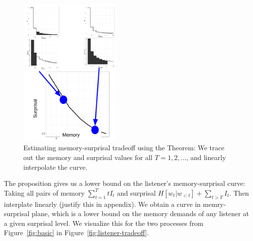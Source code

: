 \begin{figure}
	\begin{center}
\includegraphics[width=0.45\textwidth]{figures/interpolate-curve.png}
\end{center}
	\caption{Estimating memory-surprisal tradeoff using the Theorem: We trace out the memory and surprisal values for all $T=1, 2, ...$, and linearly interpolate the curve.}\label{fig:interpolate}
\end{figure}







The proposition gives us a lower bound on the listener's memory-surprisal curve: Taking all pairs of memory $\sum_{t=1}^T t I_t$ and surprisal $H[w_t|w_{<t}] + \sum_{t > T} I_t$.
Then interplate linearly (justify this in appendix).
We obtain a curve in memry-surprisal plane, which is a lower bound on the memory demands of any listener at a given surprisal level.
We visualize this for the two processes from Figure~\ref{fig:basic} in Figure~\ref{fig:listener-tradeoff}.


